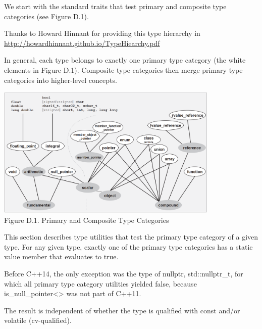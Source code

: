 
We start with the standard traits that test primary and composite type categories (see Figure D.1).

\begin{tcolorbox}[colback=webgreen!5!white,colframe=webgreen!75!black]
\hspace*{0.75cm}Thanks to Howard Hinnant for providing this type hierarchy in \url{http://howardhinnant.github.io/TypeHiearchy.pdf}
\end{tcolorbox}

In general, each type belongs to exactly one primary type category (the white elements in Figure D.1). Composite type categories then merge primary type categories into higher-level concepts.

\begin{center}
\includegraphics[width=0.8\textwidth]{content/Appendix/D/images/1.png} \\
Figure D.1. Primary and Composite Type Categories
\end{center}


This section describes type utilities that test the primary type category of a given type. For any given type, exactly one of the primary type categories has a static value member that evaluates to true.

\begin{tcolorbox}[colback=webgreen!5!white,colframe=webgreen!75!black]
\hspace*{0.75cm}Before C++14, the only exception was the type of nullptr, std::nullptr\_t, for which all primary type category utilities yielded false, because is\_null\_pointer<> was not part of C++11.
\end{tcolorbox}

The result is independent of whether the type is qualified with const and/or volatile (cv-qualified).

